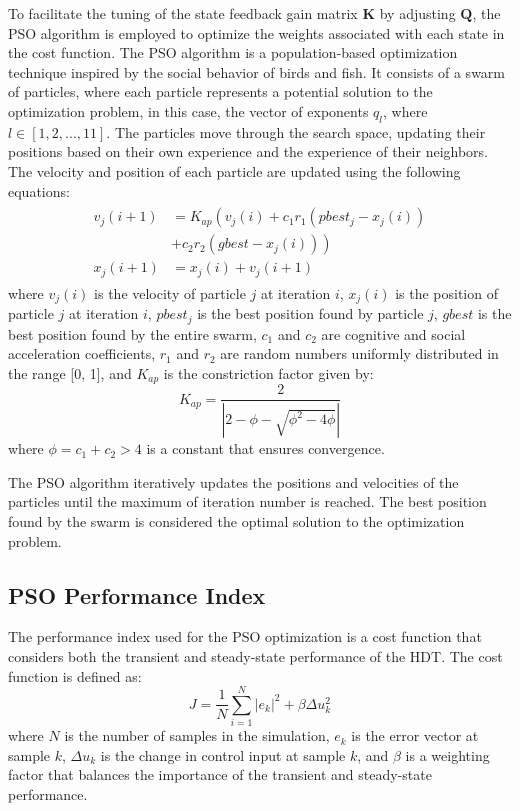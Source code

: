 To facilitate the tuning of the state feedback gain matrix $\mathbf{K}$ by adjusting $\mathbf{Q}$, the PSO algorithm is employed to optimize the weights associated with each state in the cost function. The PSO algorithm is a population-based optimization technique inspired by the social behavior of birds and fish. It consists of a swarm of particles, where each particle represents a potential solution to the optimization problem, in this case, the vector of exponents $q_l$, where $l\in\left[1,2,...,11\right]$. The particles move through the search space, updating their positions based on their own experience and the experience of their neighbors. The velocity and position of each particle are updated using the following equations:
\begin{align}
    \begin{aligned}
        v_j(i + 1) &= K_{ap}\left(v_j(i) + c_1 r_1 (pbest_j - x_j(i)) \right.\\
        & \left. + c_2 r_2 (gbest - x_j(i))\right)\\
        x_j(i + 1) &= x_j(i) + v_j(i + 1)
    \end{aligned}
\end{align}
where $v_j(i)$ is the velocity of particle $j$ at iteration $i$, $x_j(i)$ is the position of particle $j$ at iteration $i$, $pbest_j$ is the best position found by particle $j$, $gbest$ is the best position found by the entire swarm, $c_1$ and $c_2$ are cognitive and social acceleration coefficients, $r_1$ and $r_2$ are random numbers uniformly distributed in the range [0, 1], and $K_{ap}$ is the constriction factor given by:
\begin{equation}
    K_{ap} = \dfrac{2}{\left|2 - \phi - \sqrt{\phi^2 - 4\phi}\right|}
\end{equation}
where $\phi = c_1 + c_2 > 4$ is a constant that ensures convergence.

The PSO algorithm iteratively updates the positions and velocities of the particles until the maximum of iteration number is reached. The best position found by the swarm is considered the optimal solution to the optimization problem.

\subsection{PSO Performance Index}

The performance index used for the PSO optimization is a cost function that considers both the transient and steady-state performance of the HDT. The cost function is defined as:
\begin{equation}
    J = \dfrac{1}{N} \sum_{i=1}^{N} |e_k|^2 + \beta \Delta u_k^2
\end{equation}
where $N$ is the number of samples in the simulation, $e_k$ is the error vector at sample $k$, $\Delta u_k$ is the change in control input at sample $k$, and $\beta$ is a weighting factor that balances the importance of the transient and steady-state performance.

